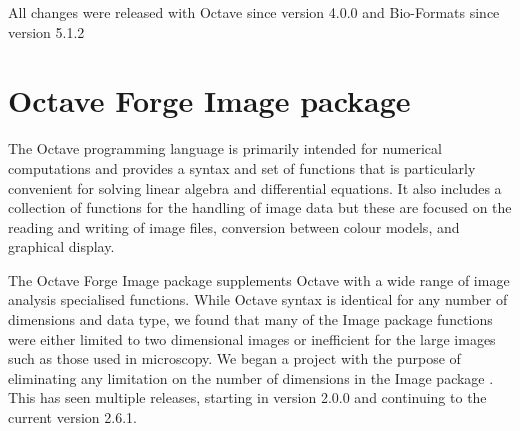 All changes were released with Octave since version 4.0.0 and
Bio-Formats since version 5.1.2

\section{Octave Forge Image package}

The Octave programming language is primarily intended for numerical
computations and provides a syntax and set of functions that is particularly
convenient for solving linear algebra and differential equations.  It
also includes a collection of functions for the handling of image data
but these are focused on the reading and writing of image files,
conversion between colour models, and graphical display.

The Octave Forge Image package supplements Octave with a wide range of
image analysis specialised functions.  While Octave syntax is
identical for any number of dimensions and data type, we found that
many of the Image package functions were either limited to two
dimensional images or inefficient for the large images such as those used in
microscopy.  We began a project with the purpose of eliminating any
limitation on the number of dimensions in the Image package
.  This has seen multiple
releases, starting in version 2.0.0 and continuing to the current
version 2.6.1.

